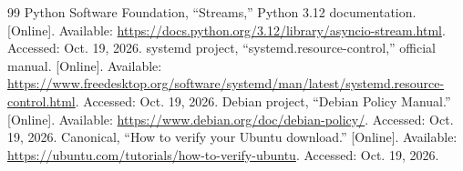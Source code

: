 \begin{thebibliography}{99}
 Python Software Foundation, ``Streams,'' Python 3.12 documentation. [Online]. Available: \url{https://docs.python.org/3.12/library/asyncio-stream.html}. Accessed: Oct. 19, 2026.
 systemd project, ``systemd.resource-control,'' official manual. [Online]. Available: \url{https://www.freedesktop.org/software/systemd/man/latest/systemd.resource-control.html}. Accessed: Oct. 19, 2026.
 Debian project, ``Debian Policy Manual.'' [Online]. Available: \url{https://www.debian.org/doc/debian-policy/}. Accessed: Oct. 19, 2026.
 Canonical, ``How to verify your Ubuntu download.'' [Online]. Available: \url{https://ubuntu.com/tutorials/how-to-verify-ubuntu}. Accessed: Oct. 19, 2026.
\end{thebibliography}

